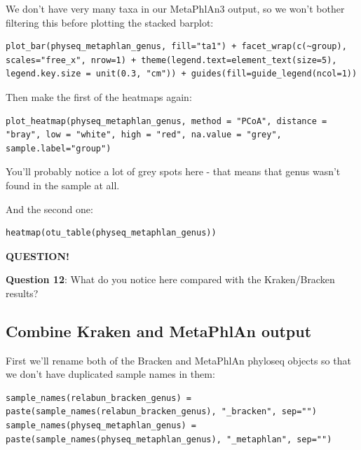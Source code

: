 \documentclass[
]{book}
\newenvironment{bluebox}{
  \definecolor{shadecolor}{RGB}{172, 210, 237}
  \color{white}
  \begin{shaded}}
 {\end{shaded}}
\begin{document}
We don't have very many taxa in our MetaPhlAn3 output, so we won't bother filtering this before plotting the stacked barplot:

\begin{verbatim}
plot_bar(physeq_metaphlan_genus, fill="ta1") + facet_wrap(c(~group), scales="free_x", nrow=1) + theme(legend.text=element_text(size=5), legend.key.size = unit(0.3, "cm")) + guides(fill=guide_legend(ncol=1))
\end{verbatim}

Then make the first of the heatmaps again:

\begin{verbatim}
plot_heatmap(physeq_metaphlan_genus, method = "PCoA", distance = "bray", low = "white", high = "red", na.value = "grey", sample.label="group")
\end{verbatim}

You'll probably notice a lot of grey spots here - that means that genus wasn't found in the sample at all.

And the second one:

\begin{verbatim}
heatmap(otu_table(physeq_metaphlan_genus))
\end{verbatim}

\begin{bluebox}

\begin{center}
\textbf{QUESTION!}

\end{center}

\textbf{Question 12}: What do you notice here compared with the Kraken/Bracken results?

\end{bluebox}

\subsection{Combine Kraken and MetaPhlAn output}\label{combine-kraken-and-metaphlan-output}

First we'll rename both of the Bracken and MetaPhlAn phyloseq objects so that we don't have duplicated sample names in them:

\begin{verbatim}
sample_names(relabun_bracken_genus) = paste(sample_names(relabun_bracken_genus), "_bracken", sep="")
sample_names(physeq_metaphlan_genus) = paste(sample_names(physeq_metaphlan_genus), "_metaphlan", sep="")
\end{verbatim}
\end{document}
